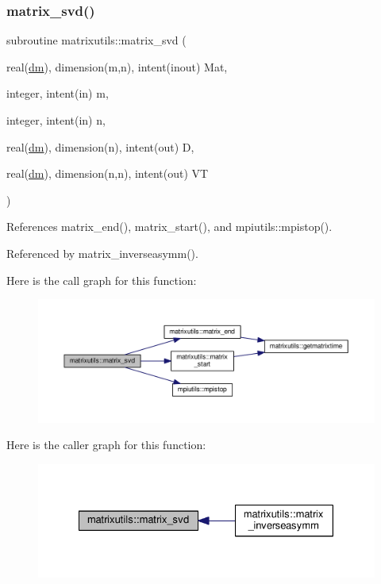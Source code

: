 \subsubsection{\texorpdfstring{matrix\+\_\+svd()}{matrix\_svd()}}
{\footnotesize\ttfamily subroutine matrixutils\+::matrix\+\_\+svd (\begin{DoxyParamCaption}\item[{real(\mbox{\hyperlink{namespacematrixutils_a7bdc564986ea4d90f51201c75606ef3d}{dm}}), dimension(m,n), intent(inout)}]{Mat,  }\item[{integer, intent(in)}]{m,  }\item[{integer, intent(in)}]{n,  }\item[{real(\mbox{\hyperlink{namespacematrixutils_a7bdc564986ea4d90f51201c75606ef3d}{dm}}), dimension(n), intent(out)}]{D,  }\item[{real(\mbox{\hyperlink{namespacematrixutils_a7bdc564986ea4d90f51201c75606ef3d}{dm}}), dimension(n,n), intent(out)}]{VT }\end{DoxyParamCaption})}



References matrix\+\_\+end(), matrix\+\_\+start(), and mpiutils\+::mpistop().



Referenced by matrix\+\_\+inverseasymm().

Here is the call graph for this function\+:
\nopagebreak
\begin{figure}[H]
\begin{center}
\leavevmode
\includegraphics[width=350pt]{namespacematrixutils_a7960d8813f71cc715ba85ffba471dd38_cgraph}
\end{center}
\end{figure}
Here is the caller graph for this function\+:
\nopagebreak
\begin{figure}[H]
\begin{center}
\leavevmode
\includegraphics[width=328pt]{namespacematrixutils_a7960d8813f71cc715ba85ffba471dd38_icgraph}
\end{center}
\end{figure}
\mbox{\label{namespacematrixutils_a295b572473f10f878fb8d3fc7b8d06f1}} 
